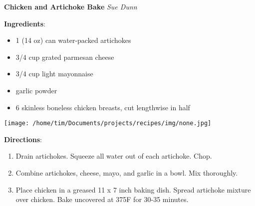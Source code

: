 \documentclass[11pt, twoside, openany]{book}
\begin{document}
\noindent\begin{minipage}[t]{\linewidth}%
{\Large\textbf{Chicken and Artichoke Bake}} \label{chicken-and-artichoke-bake}\hfill\textit{Sue Dunn}\\
\noindent\begin{minipage}[t]{0.78\linewidth}%
\textbf{Ingredients}:\vspace{-3mm}
\begin{multicols}{2}
\begin{itemize}\setlength\itemsep{-1mm}
\item 1 (14 oz) can water-packed artichokes
\item 3/4 cup grated parmesan cheese
\item 3/4 cup light mayonnaise
\item garlic powder
\item 6 skinless boneless chicken breasts, cut lengthwise in half
\end{itemize}
\end{multicols}
\end{minipage}
\noindent\begin{minipage}[t]{0.18\linewidth}
\centering \strut\vspace*{-\baselineskip}\newline
\texttt{[image: /home/tim/Documents/projects/recipes/img/none.jpg]}\\
\end{minipage}\vspace{3mm}
\textbf{Directions}:
\vspace{-3mm}\begin{enumerate}\setlength\itemsep{-1mm}
\item Drain artichokes. Squeeze all water out of each artichoke. Chop.
\item Combine artichokes, cheese, mayo, and garlic in a bowl. Mix thoroughly.
\item Place chicken in a greased 11 x 7 inch baking dish. Spread artichoke mixture over chicken. Bake uncovered at 375F for 30-35 minutes.
\end{enumerate}
\end{minipage}\vspace{8mm}
\end{document}

